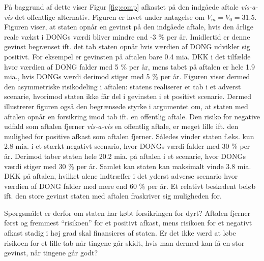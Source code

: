 \documentclass{article}
\begin{document}

På baggrund af dette viser Figur \ref{fig:comp} afkastet på den indgåede aftale \emph{vis-a-vis} det offentlige alternativ. Figuren er lavet under antagelse om  $V_m=V_0=31.5$. Figuren viser, at staten opnår en gevinst på den indgåede aftale, hvis den årlige reale vækst i DONGs værdi bliver mindre end -3 \% per år. Imidlertid er denne gevinst begrænset ift. det tab staten opnår hvis værdien af DONG udvikler sig positivt. For eksempel er gevinsten på aftalen bare 0.4 mia. DKK i det tilfælde hvor værdien af DONG falder med 5 \% per år, mens tabet på aftalen er hele 1.9 mia., hvis DONGs værdi derimod stiger med 5 \% per år. Figuren viser dermed den asymmetriske risikodeling i aftalen: statens realiserer et tab i et adverst scenarie, hvorimod staten ikke får del i gevinsten i et positivt scenarie. Dermed illustrerer figuren også den begrænsede styrke i argumentet om, at staten med aftalen opnår en forsikring imod tab ift. en offentlig aftale. Den risiko for negative udfald som aftalen fjerner \emph{vis-a-vis} en offentlig aftale, er meget lille ift. den mulighed for positive afkast som aftalen fjerner. Således vinder staten f.eks. kun 2.8 mia. i et stærkt negativt scenario, hvor DONGs værdi falder med 30 \% per år. Derimod taber staten hele 20.2 mia. på aftalen i et scenarie, hvor DONGs værdi stiger med 30 \% per år. Samlet kan staten kan maksimalt vinde 3.8 mia. DKK på aftalen, hvilket alene indtræffer i det yderst adverse scenario hvor værdien af DONG falder med mere end 60 \% per år. Et relativt beskedent beløb ift. den store gevinst staten med aftalen fraskriver sig muligheden for. 

Spørgsmålet er derfor om staten har købt forsikringen for dyrt? Aftalen fjerner først og fremmest \enquote{risikoen} for et positivt afkast, mens risikoen for et negativt afkast stadig i høj grad skal finansieres af staten. Er det ikke værd at løbe risikoen for et lille tab når tingene går skidt, hvis man dermed kan få en stor gevinst, når tingene går godt?
\end{document}
